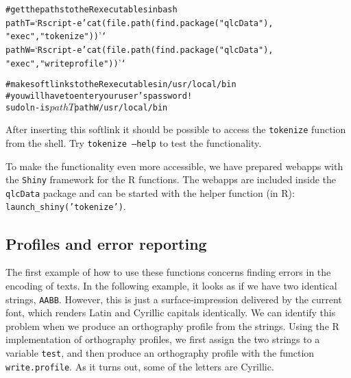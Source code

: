 \documentclass[output=inprep,
		biblatex
		]{LSP/langsci}\usepackage[]{graphicx}\usepackage[]{color}
\makeatletter
\newenvironment{kframe}{%
 \def\at@end@of@kframe{}%
 \ifinner\ifhmode%
  \def\at@end@of@kframe{\end{minipage}}%
  \begin{minipage}{\columnwidth}%
 \fi\fi%
 \def\FrameCommand##1{\hskip\@totalleftmargin \hskip-\fboxsep
 \colorbox{shadecolor}{##1}\hskip-\fboxsep
     \hskip-\linewidth \hskip-\@totalleftmargin \hskip\columnwidth}%
 \MakeFramed {\advance\hsize-\width
   \@totalleftmargin\z@ \linewidth\hsize
   \@setminipage}}%
 {\par\unskip\endMakeFramed%
 \at@end@of@kframe}
\newenvironment{knitrout}{}{} %
\makeatother
\begin{document}
\begin{knitrout}\scriptsize
{}\color{fgcolor}\begin{kframe}
\begin{alltt}
# get the paths to the R executables in bash
pathT=`Rscript -e 'cat(file.path(find.package("qlcData"), 
  "exec", "tokenize"))'`
pathW=`Rscript -e 'cat(file.path(find.package("qlcData"), 
  "exec", "writeprofile"))'`

# make softlinks to the R executables in /usr/local/bin
# you will have to enter your user's password!
sudo ln -is $pathT $pathW /usr/local/bin
\end{alltt}
\end{kframe}
\end{knitrout}

After inserting this softlink it should be possible to access the
\texttt{tokenize} function from the shell. Try \texttt{tokenize --help} to test
the functionality.



To make the functionality even more accessible, we have prepared webapps with 
the \texttt{Shiny} framework for the R functions. The webapps are 
included inside the \texttt{qlcData} package and can be started with the 
helper function (in R): \texttt{launch\_shiny('tokenize')}.




\subsection*{Profiles and error reporting}
\label{error-reporting}

The first example of how to use these functions concerns finding errors in the
encoding of texts. In the following example, it looks as if we have two
identical strings, \texttt{AABB}. However, this is just a surface-impression
delivered by the current font, which renders Latin and Cyrillic capitals
identically. We can identify this problem when we produce an orthography profile
from the strings. Using the R implementation of orthography profiles, we
first assign the two strings to a variable \texttt{test}, and then produce an
orthography profile with the function \texttt{write.profile}. As it turns out,
some of the letters are Cyrillic.
\end{document}
